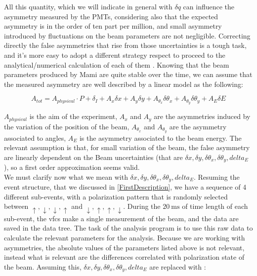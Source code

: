 All this quantity, which we will indicate in general with $\delta q$ can influence the asymmetry measured by the PMTs, considering also that the expected asymmetry is in the order of ten part per million, and small asymmetry introduced by fluctuations on the beam parameters are not negligible. Correcting directly the false asymmetries that rise from those uncertainties is a tough task, and it's more easy to adopt a different strategy respect to proceed to the analytical/numerical calculation of each of them . Knowing that the beam parameters produced by Mami are quite stable over the time, we can assume that the measured asymmetry are well described by a linear model as the following:

\begin{equation}
A_{tot} = A_{physical} \cdot P + \delta_{I} + A_{x} \delta x + A_{y} \delta y + A_{\theta_{x}} \delta \theta_{x} + A_{\theta_{y}} \delta \theta_{y}+ A_{E} \delta E 
\end{equation}

$A_{physical}$ is the aim of the experiment, $A_{x}$ and $A_{y}$ are the asymmetries induced by the variation of the position of the beam, $A_{\theta_{x}}$ and $A_{\theta_{y}}$ are the asymmetry associated to angles, $A_{E}$ is the asymmetry associated to the beam energy. 
The relevant assumption is that, for small variation of the beam, the false asymmetry are linearly dependent on the Beam uncertainties (that are $\delta x, \delta y, \delta \theta_{x}, \delta \theta_{y}, delta_{E}$), so a first order approximation seems valid.\\
We must clarify now what we mean with $\delta x, \delta y, \delta \theta_{x}, \delta \theta_{y}, delta_{E}$. Resuming the event structure, that we discussed in \ref{FirstDescription}, we have a sequence of 4 different sub-events, with a polarization pattern that is randomly selected between $\uparrow,\downarrow,\downarrow, \uparrow$ and $\downarrow,\uparrow,\uparrow,\downarrow$. During the $\SI{20}{\milli \second}$ of time length of each sub-event, the vfcs make a single measurement of the beam, and the data are saved in the data tree. The task of the analysis program is to use this raw data to calculate the relevant parameters for the analysis. Because we are working with asymmetries, the absolute values of the parameters listed above is not relevant, instead what is relevant are the differences correlated with polarization state of the beam. Assuming this, $\delta x, \delta y, \delta \theta_{x}, \delta \theta_{y}, delta_{E}$ are replaced with :

